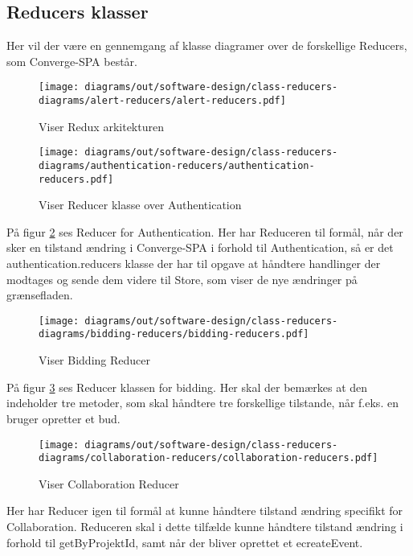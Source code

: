 \subsection{Reducers klasser}

Her vil der være en gennemgang af klasse diagramer over de forskellige Reducers, som Converge-SPA består.

\begin{figure}[H]
    \centering
\texttt{[image: diagrams/out/software-design/class-reducers-diagrams/alert-reducers/alert-reducers.pdf]}
\caption{Viser Redux arkitekturen}
\label{fig:redux}
\end{figure}


\begin{figure}[H]
    \centering
\texttt{[image: diagrams/out/software-design/class-reducers-diagrams/authentication-reducers/authentication-reducers.pdf]}
\caption{Viser Reducer klasse over Authentication}
\label{fig:authreducer}
\end{figure}
På figur \ref{fig:authreducer} ses Reducer for Authentication. Her har Reduceren til formål, når der sker en tilstand ændring i Converge-SPA i forhold til Authentication, så er det authentication.reducers klasse der har til opgave at håndtere handlinger der modtages og sende dem videre til Store, som viser de nye ændringer på grænsefladen. 


\begin{figure}[H]
    \centering
\texttt{[image: diagrams/out/software-design/class-reducers-diagrams/bidding-reducers/bidding-reducers.pdf]}
\caption{Viser Bidding Reducer}
\label{fig:bidding}
\end{figure}

På figur \ref{fig:bidding} ses Reducer klassen for bidding. Her skal der bemærkes at den indeholder tre metoder, som skal håndtere tre forskellige tilstande,  når f.eks. en bruger opretter et bud. 

\begin{figure}[H]
    \centering
\texttt{[image: diagrams/out/software-design/class-reducers-diagrams/collaboration-reducers/collaboration-reducers.pdf]}
\caption{Viser Collaboration Reducer}
\label{fig:collaboration}
\end{figure}

Her har Reducer igen til formål at kunne håndtere tilstand ændring specifikt for Collaboration. Reduceren skal i dette tilfælde kunne håndtere tilstand ændring i forhold til getByProjektId, samt når der bliver oprettet et ecreateEvent.

